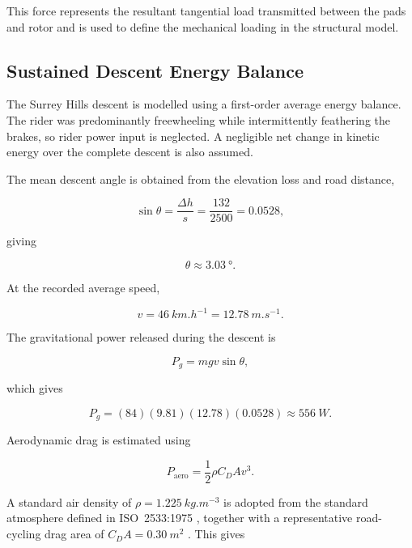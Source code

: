 \documentclass[11pt,a4paper]{article}
\begin{document}
This force represents the resultant tangential load transmitted between the
pads and rotor and is used to define the mechanical loading in the structural
model.


\subsection{Sustained Descent Energy Balance}

The Surrey Hills descent is modelled using a first-order average energy
balance. The rider was predominantly freewheeling while intermittently
feathering the brakes, so rider power input is neglected. A negligible net
change in kinetic energy over the complete descent is also assumed.

The mean descent angle is obtained from the elevation loss and road distance,

\begin{equation}
    \sin\theta =
    \frac{\Delta h}{s}
    =
    \frac{132}{2500}
    =
    0.0528,
\end{equation}

giving

\begin{equation}
    \theta \approx \SI{3.03}{\degree}.
\end{equation}

At the recorded average speed,

\begin{equation}
    v =
    \SI{46}{km.h^{-1}}
    =
    \SI{12.78}{m.s^{-1}}.
\end{equation}

The gravitational power released during the descent is

\begin{equation}
    P_g = mgv\sin\theta,
\end{equation}

which gives

\begin{equation}
    P_g =
    (84)(9.81)(12.78)(0.0528)
    \approx \SI{556}{W}.
\end{equation}

Aerodynamic drag is estimated using

\begin{equation}
    P_{\mathrm{aero}}
    =
    \frac{1}{2}\rho C_DA v^3.
\end{equation}

A standard air density of
$\rho=\SI{1.225}{kg.m^{-3}}$ is adopted from the standard atmosphere
defined in ISO~2533:1975 \cite{ISO2533-1975}, together with a representative
road-cycling drag area of
$C_DA=\SI{0.30}{m^2}$ \cite{Schaffarczyk2022}.
This gives
\end{document}
